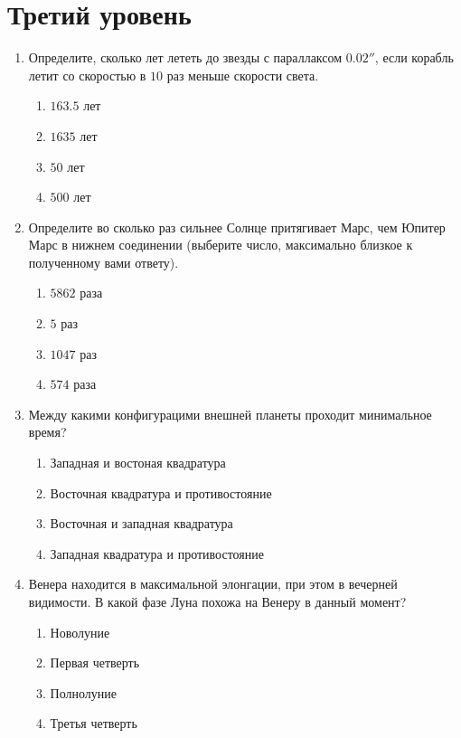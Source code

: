 \documentclass[12pt]{article}
\begin{document}
\section*{Третий уровень}
\begin{enumerate}[resume]
	\item Определите, сколько лет лететь до звезды с параллаксом $0.02''$, если корабль летит со скоростью в $10$ раз меньше скорости света.
	\begin{multicols}{2}
		\begin{enumerate}[label=\textbf{\Alph*.}]
			\item{$163.5$ лет} \item{$1635$ лет}
			\item{$50$ лет} \item{$500$ лет} 
		\end{enumerate}	
	\end{multicols}

	\item Определите во сколько раз сильнее Солнце притягивает Марс, чем Юпитер Марс в нижнем соединении (выберите число, максимально близкое к полученному вами ответу).
	\begin{multicols}{2}
		\begin{enumerate}[label=\textbf{\Alph*.}]
			\item{$5862$ раза} \item{$5$ раз}
			\item{$1047$ раз} \item{$574$ раза} 
		\end{enumerate}	
	\end{multicols}

	\item Между какими конфигурацими внешней планеты проходит минимальное время?
	\begin{multicols}{2}
		\begin{enumerate}[label=\textbf{\Alph*.}]
			\item{Западная и  востоная квадратура} \item{Восточная квадратура и противостояние} 
			
			\item{Восточная и западная квадратура} \item{Западная квадратура и противостояние}
		\end{enumerate}	
	\end{multicols}

	\item Венера находится в максимальной элонгации, при этом в вечерней видимости. В какой фазе Луна похожа на Венеру в данный момент?
	\begin{multicols}{2}
		\begin{enumerate}[label=\textbf{\Alph*.}]
			\item{Новолуние} \item{Первая четверть}
			\item{Полнолуние} \item{Третья четверть} 
		\end{enumerate}	
	\end{multicols}


\end{enumerate}
\end{document}
